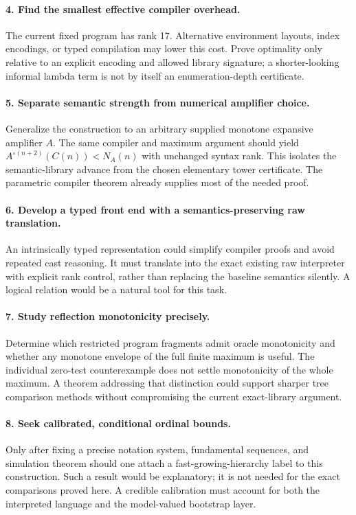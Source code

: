 \documentclass[11pt,letterpaper]{article}
\theoremstyle{definition}
\begin{document}
\paragraph{4. Find the smallest effective compiler overhead.}
The current fixed program has rank 17. Alternative environment layouts,
index encodings, or typed compilation may lower this cost. Prove optimality
only relative to an explicit encoding and allowed library signature; a
shorter-looking informal lambda term is not by itself an enumeration-depth
certificate.

\paragraph{5. Separate semantic strength from numerical amplifier choice.}
Generalize the construction to an arbitrary supplied monotone expansive
amplifier $A$. The same compiler and maximum argument should yield
$A^{\circ(n+2)}(C(n))<N_A(n)$ with unchanged syntax rank. This isolates the
semantic-library advance from the chosen elementary tower certificate.
The parametric compiler theorem already supplies most of the needed proof.

\paragraph{6. Develop a typed front end with a semantics-preserving raw translation.}
An intrinsically typed representation could simplify compiler proofs and avoid
repeated cast reasoning. It must translate into the exact existing raw
interpreter with explicit rank control, rather than replacing the baseline
semantics silently. A logical relation would be a natural tool for this task.

\paragraph{7. Study reflection monotonicity precisely.}
Determine which restricted program fragments admit oracle monotonicity and
whether any monotone envelope of the full finite maximum is useful. The
individual zero-test counterexample does not settle monotonicity of the whole
maximum. A theorem addressing that distinction could support sharper tree
comparison methods without compromising the current exact-library argument.

\paragraph{8. Seek calibrated, conditional ordinal bounds.}
Only after fixing a precise notation system, fundamental sequences, and
simulation theorem should one attach a fast-growing-hierarchy label to this
construction. Such a result would be explanatory; it is not needed for the
exact comparisons proved here. A credible calibration must account for both
the interpreted language and the model-valued bootstrap layer.
\end{document}
